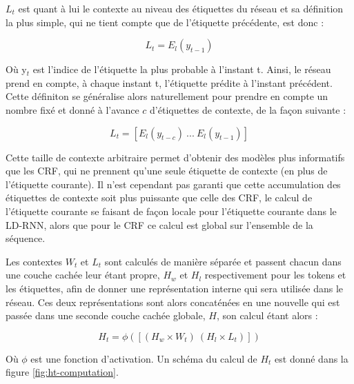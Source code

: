 \documentclass[citation\_needed]{subfiles}
\begin{document}
$L_{t}$ est quant à lui le contexte au niveau des étiquettes du réseau et sa définition la plus simple, qui ne tient compte que de l'étiquette précédente, est donc :

\begin{equation}\label{eq:LD-RNN-minimal}
L_{t} = E_{l}(y_{t-1})
\end{equation}

Où y$_{t}$ est l'indice de l'étiquette la plus probable à l'instant t. Ainsi, le réseau prend en compte, à chaque instant t, l'étiquette prédite à l'instant précédent. Cette définiton se généralise alors naturellement pour prendre en compte un nombre fixé et donné à l'avance $c$ d'étiquettes de contexte, de la façon suivante :

\begin{equation}\label{eq:LD-RNN-label-window}
L_{t} = \left[ E_{l}(y_{t-c})\ ...\ E_{l}(y_{t-1}) \right]
\end{equation}

Cette taille de contexte arbitraire permet d'obtenir des modèles plus informatifs que les CRF, qui ne prennent qu'une seule étiquette de contexte (en plus de l'étiquette courante). Il n'est cependant pas garanti que cette accumulation des étiquettes de contexte soit plus puissante que celle des CRF, le calcul de l'étiquette courante se faisant de façon locale pour l'étiquette courante dans le LD-RNN, alors que pour le CRF ce calcul est global sur l'ensemble de la séquence.

Les contextes $W_{t}$ et $L_{t}$ sont calculés de manière séparée et passent chacun dans une couche cachée leur étant propre, $H_{w}$ et $H_{l}$ respectivement pour les tokens et les étiquettes, afin de donner une représentation interne qui sera utilisée dans le réseau. Ces deux représentations sont alors concaténées en une nouvelle qui est passée dans une seconde couche cachée globale, $H$, son calcul étant alors :

\begin{equation}\label{eq:LD-RNN-hidden}
H_{t} = \phi(\left[ (H_{w} \times W_{t})\ (H_{l} \times L_{t}) \right])
\end{equation}

Où $\phi$ est une fonction d'activation. Un schéma du calcul de $H_{t}$ est donné dans la figure \ref{fig:ht-computation}.
\end{document}
